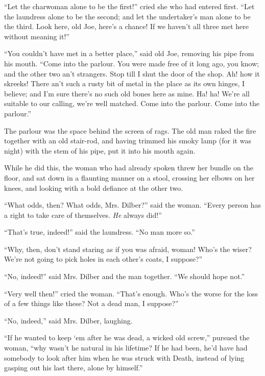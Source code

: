 \documentclass[paper=a5,BCOR=15mm,twoside,DIV=15,headinclude=off,12pt,chapterprefix=off,openany,headings=huge]{scrbook} %
\begin{document}
\enquote{Let the charwoman alone to be the first!} cried she who had entered first. \enquote{Let the laundress alone to be the second; and let the undertaker's man alone to be the third. Look here, old Joe, here's a chance! If we haven't all three met here without meaning it!}

\enquote{You couldn't have met in a better place,} said old Joe, removing his pipe from his mouth. \enquote{Come into the parlour. You were made free of it long ago, you know; and the other two an't strangers. Stop till I shut the door of the shop. Ah! how it skreeks! There an't such a rusty bit of metal in the place as its own hinges, I believe; and I'm sure there's no such old bones here as mine. Ha! ha! We're all suitable to our calling, we're well matched. Come into the parlour. Come into the parlour.}

The parlour was the space behind the screen of rags. The old man raked the fire together with an old stair-rod, and having trimmed his smoky lamp (for it was night) with the stem of his pipe, put it into his mouth again.

While he did this, the woman who had already spoken threw her bundle on the floor, and sat down in a flaunting manner on a stool, crossing her elbows on her knees, and looking with a bold defiance at the other two.

\enquote{What odds, then? What odds, Mrs. Dilber?} said the woman. \enquote{Every person has a right to take care of themselves. \textit{He} always did!}

\enquote{That's true, indeed!} said the laundress. \enquote{No man more so.}

\enquote{Why, then, don't stand staring as if you was afraid, woman! Who's the wiser? We're not going to pick holes in each other's coats, I suppose?}

\enquote{No, indeed!} said Mrs. Dilber and the man together. \enquote{We should hope not.}

\enquote{Very well then!} cried the woman. \enquote{That's enough. Who's the worse for the loss of a few things like these? Not a dead man, I suppose?}

\enquote{No, indeed,} said Mrs. Dilber, laughing.

\enquote{If he wanted to keep `em after he was dead, a wicked old screw,} pursued the woman, \enquote{why wasn't he natural in his lifetime? If he had been, he'd have had somebody to look after him when he was struck with Death, instead of lying gasping out his last there, alone by himself.}
\end{document}

